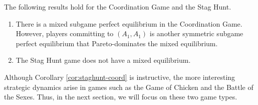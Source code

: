 \documentclass[../paper.tex]{subfiles}
\begin{document}
\begin{corollary}
    The following results hold for the Coordination Game and the Stag Hunt.

    \begin{enumerate}
        \item There is a mixed subgame perfect equilibrium in the Coordination Game. However, players committing to $(A_1,A_1)$ is another symmetric subgame perfect equilibrium that Pareto-dominates the mixed equilibrium.
        \item The Stag Hunt game does not have a mixed equilibrium.
    \end{enumerate}
    \label{cor:staghunt-coord}
\end{corollary}

\noindent Although Corollary \ref{cor:staghunt-coord} is instructive, the more interesting strategic dynamics arise in games such as the Game of Chicken and the Battle of the Sexes. Thus, in the next section, we will focus on these two game types.
\end{document}

